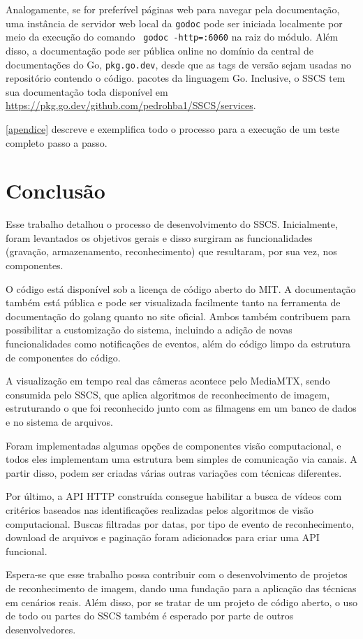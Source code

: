 \documentclass[12pt, %
openright, 
oneside, %
a4paper,    %
brazil]{facom-ufu-abntex2}
\begin{document}
Analogamente, se for preferível páginas web para navegar pela documentação, uma
instância de servidor web local da \texttt{godoc} pode ser iniciada localmente
por meio da execução do comando \texttt{ godoc -http=:6060} na raiz
do módulo. Além disso, a documentação pode ser pública online no domínio da
central de documentações do Go, \texttt{pkg.go.dev}, desde que as tags de
versão sejam usadas no repositório contendo o código. pacotes da linguagem Go.
Inclusive, o SSCS tem sua documentação toda disponível em
\url{https://pkg.go.dev/github.com/pedrohba1/SSCS/services}.

\autoref{apendice} descreve e exemplifica todo o processo para a execução de um
teste completo passo a passo.	 \chapter[Conclusão]{Conclusão}  Esse trabalho
detalhou o processo de desenvolvimento do SSCS. Inicialmente, foram levantados
os objetivos gerais e disso surgiram as funcionalidades (gravação,
armazenamento, reconhecimento) que resultaram, por sua vez, nos
componentes.%

O código está disponível sob a licença de código aberto do MIT. A documentação
também está pública e pode ser visualizada facilmente tanto na ferramenta de
documentação do golang quanto no site oficial. Ambos também contribuem para
possibilitar a customização do sistema, incluindo a adição de novas
funcionalidades como notificações de eventos, além do código limpo da estrutura
de componentes do código.

A visualização em tempo real das câmeras acontece pelo MediaMTX, sendo
consumida pelo SSCS, que aplica algoritmos de reconhecimento de imagem,
estruturando o que foi reconhecido junto com as filmagens em um banco de dados
e no sistema de arquivos.

Foram implementadas algumas opções de componentes visão computacional, e todos
eles implementam uma estrutura bem simples de comunicação via canais. A partir
disso, podem ser criadas várias outras variações com técnicas diferentes.

Por último, a API HTTP construída consegue habilitar a busca de vídeos com
critérios baseados nas identificações realizadas pelos algoritmos de visão
computacional. Buscas filtradas por datas, por tipo de evento de
reconhecimento, download de arquivos e paginação foram adicionados para criar
uma API funcional.

Espera-se que esse trabalho possa contribuir com o desenvolvimento de projetos
de reconhecimento de imagem, dando uma fundação para a aplicação das técnicas
em cenários reais. Além disso, por se tratar de um projeto de código aberto, o
uso de todo ou partes do SSCS também é esperado por parte de outros
desenvolvedores.
\end{document}
